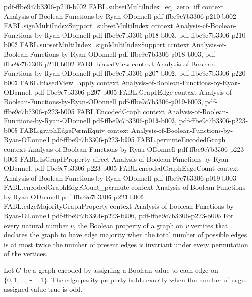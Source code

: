 \begin{theorem}
  {pdf-ffbe9c7b3306-p210-b002}
\proofstep
  {FABL.subsetMultiIndex_eq_zero_iff}
  {context}
  {Analysis-of-Boolean-Functions-by-Ryan-ODonnell}
  {pdf-ffbe9c7b3306-p210-b002}
\proofstep
  {FABL.signMultiIndexSupport_subsetMultiIndex}
  {context}
  {Analysis-of-Boolean-Functions-by-Ryan-ODonnell}
  {pdf-ffbe9c7b3306-p018-b003,
    pdf-ffbe9c7b3306-p210-b002}
\proofstep
  {FABL.subsetMultiIndex_signMultiIndexSupport}
  {context}
  {Analysis-of-Boolean-Functions-by-Ryan-ODonnell}
  {pdf-ffbe9c7b3306-p018-b003,
    pdf-ffbe9c7b3306-p210-b002}
\proofstep
  {FABL.biasedView}
  {context}
  {Analysis-of-Boolean-Functions-by-Ryan-ODonnell}
  {pdf-ffbe9c7b3306-p207-b002,
    pdf-ffbe9c7b3306-p220-b003}
\proofstep
  {FABL.biasedView_apply}
  {context}
  {Analysis-of-Boolean-Functions-by-Ryan-ODonnell}
  {pdf-ffbe9c7b3306-p207-b005}
\proofstep
  {FABL.GraphEdge}
  {context}
  {Analysis-of-Boolean-Functions-by-Ryan-ODonnell}
  {pdf-ffbe9c7b3306-p019-b003,
    pdf-ffbe9c7b3306-p223-b005}
\proofstep
  {FABL.EncodedGraph}
  {context}
  {Analysis-of-Boolean-Functions-by-Ryan-ODonnell}
  {pdf-ffbe9c7b3306-p019-b003,
    pdf-ffbe9c7b3306-p223-b005}
\proofstep
  {FABL.graphEdgePermEquiv}
  {context}
  {Analysis-of-Boolean-Functions-by-Ryan-ODonnell}
  {pdf-ffbe9c7b3306-p223-b005}
\proofstep
  {FABL.permuteEncodedGraph}
  {context}
  {Analysis-of-Boolean-Functions-by-Ryan-ODonnell}
  {pdf-ffbe9c7b3306-p223-b005}
\proofstep
  {FABL.IsGraphProperty}
  {direct}
  {Analysis-of-Boolean-Functions-by-Ryan-ODonnell}
  {pdf-ffbe9c7b3306-p223-b005}
\proofstep
  {FABL.encodedGraphEdgeCount}
  {context}
  {Analysis-of-Boolean-Functions-by-Ryan-ODonnell}
  {pdf-ffbe9c7b3306-p019-b003}
\proofstep
  {FABL.encodedGraphEdgeCount_permute}
  {context}
  {Analysis-of-Boolean-Functions-by-Ryan-ODonnell}
  {pdf-ffbe9c7b3306-p223-b005}
\proofstep
  {FABL.edgeMajorityGraphProperty}
  {context}
  {Analysis-of-Boolean-Functions-by-Ryan-ODonnell}
  {pdf-ffbe9c7b3306-p223-b006,
    pdf-ffbe9c7b3306-p223-b005}
For every natural number $v$, the Boolean property of a graph on $v$ vertices that
declares the graph to have edge majority when the total number of possible edges is at
most twice the number of present edges is invariant under every permutation of the
vertices.
\end{theorem}

\begin{definition}
\label{FABL.edgeParityGraphProperty}
\leanok
{}
Let $G$ be a graph encoded by assigning a Boolean value to each edge on
$\{0,1,\ldots,v-1\}$. The edge parity property holds exactly when the number of edges
assigned value true is odd.
\end{definition}

